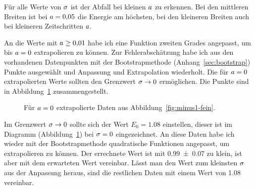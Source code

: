 Für alle Werte von $\sigma$ ist der Abfall bei kleinen $a$ zu
erkennen. Bei den mittleren Breiten ist bei $a = \num{0.05}$ die Energie
am höchsten, bei den kleineren Breiten auch bei kleineren Zeitschritten
$a$.

An die Werte mit $a \geq \num{0.01}$ habe ich eine Funktion zweiten
Grades angepasst, um bis $a = 0$ extrapolieren zu können. Zur
Fehlerabschätzung habe ich aus den vorhandenen Datenpunkten mit der
Bootstrapmethode (Anhang~\ref{sec:bootstrap}) Punkte ausgewählt und Anpassung
und Extrapolation wiederholt. Die für $a = 0$ extrapolierten Werte
sollten den Grenzwert $\sigma \to 0$ ermöglichen. Die Punkte sind in
Abbildung~\ref{fig:minus1-meta} zusammengestellt.

\begin{figure}[htbp]
    \centering
    \caption{%
        Für $a = 0$ extrapolierte Daten aus
        Abbildung~\ref{fig:minus1-fein}.
    }
    \label{fig:minus1-meta}
\end{figure}

Im Grenzwert $\sigma \to 0$ sollte sich der Wert $E_0 = \num{1.08}$
einstellen, dieser ist im Diagramm (Abbildung~\ref{fig:minus1-meta}) bei
$\sigma = 0$ eingezeichnet. An diese Daten habe ich wieder mit der
Bootstrapmethode quadratische Funktionen angepasst, um extrapolieren zu können.
Der errechnete Wert ist mit \num{0.99 +- 0.07} zu klein, ist aber mit dem
erwarteten Wert vereinbar. Lässt man den Wert zum kleinsten $\sigma$ aus
der Anpassung heraus, sind die restlichen Daten mit einem Wert von \num{1.08}
vereinbar.

